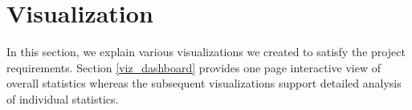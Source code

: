 \section{Visualization} \label{viz}
In this section, we explain various visualizations we created to satisfy the
project requirements. Section \ref{viz_dashboard} provides one page
interactive view of overall statistics whereas the subsequent visualizations
support detailed analysis of individual statistics.

